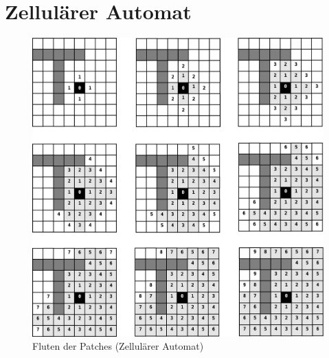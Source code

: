 \section{Zellul\"arer Automat}
\label{sec:cellular_automaton}

\begin{figure}[!ht]
\centering
\includegraphics[height=0.9\textwidth]{algorithmik/flooding.eps}
\caption{Fluten der Patches (Zellulärer Automat)}
\label{fig:flooding}
\end{figure}

